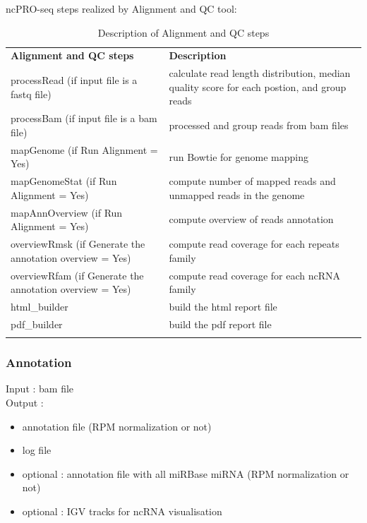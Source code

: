 \documentclass[12pt]{article}
\begin{document}
ncPRO-seq steps realized by Alignment and QC tool:
\begin{center}
\begin{longtable}{|p{8cm}|p{8cm}|}
\hline \rowcolor{gray} 
\textbf{Alignment and QC steps} &	\textbf{Description}\tabularnewline 
processRead (if input file is a fastq file) &	calculate read length distribution, median quality score for each postion, and group reads\\
processBam (if input file is a bam file) &	processed and group reads from bam files\\
mapGenome (if Run Alignment = Yes) &	run Bowtie for genome mapping\\
mapGenomeStat (if Run Alignment = Yes) &	compute number of mapped reads and unmapped reads in the genome\\
mapAnnOverview  (if Run Alignment = Yes) & compute overview of reads annotation\\
overviewRmsk  (if Generate the annotation overview = Yes) &	compute read coverage for each repeats family\\
overviewRfam  (if Generate the annotation overview = Yes) &	compute read coverage for each ncRNA family\\
html\_builder &	build the html report file\\
pdf\_builder & build the pdf report file\\
\hline
\caption{Description of Alignment and QC steps}
\label{tab:configureoptions}
\end{longtable}
\end{center}

\subsubsection{Annotation}

Input : bam file\\
Output : 
\begin{itemize}
 \item annotation file (RPM normalization or not)
 \item log file
 \item optional : annotation file with all miRBase miRNA (RPM normalization or not)
 \item optional : IGV tracks for ncRNA visualisation
\end{itemize}
\end{document}
